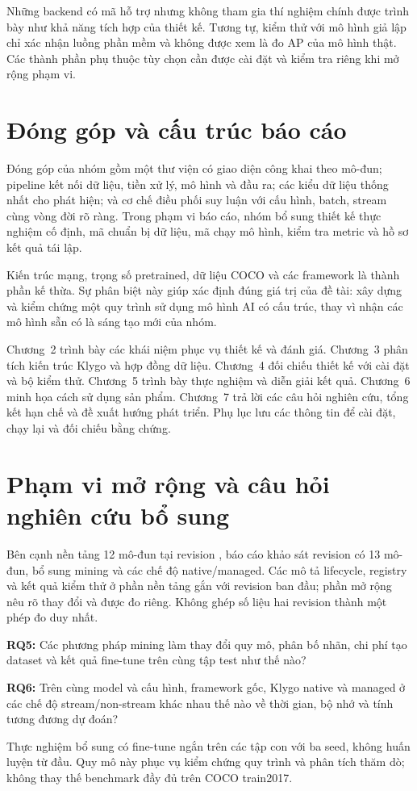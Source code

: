 Những backend có mã hỗ trợ nhưng không tham gia thí nghiệm chính được trình bày như khả năng tích hợp của thiết kế. Tương tự, kiểm thử với mô hình giả lập chỉ xác nhận luồng phần mềm và không được xem là đo AP của mô hình thật. Các thành phần phụ thuộc tùy chọn cần được cài đặt và kiểm tra riêng khi mở rộng phạm vi.

\section{Đóng góp và cấu trúc báo cáo}
Đóng góp của nhóm gồm một thư viện có giao diện công khai theo mô-đun; pipeline kết nối dữ liệu, tiền xử lý, mô hình và đầu ra; các kiểu dữ liệu thống nhất cho phát hiện; và cơ chế điều phối suy luận với cấu hình, batch, stream cùng vòng đời rõ ràng. Trong phạm vi báo cáo, nhóm bổ sung thiết kế thực nghiệm cố định, mã chuẩn bị dữ liệu, mã chạy mô hình, kiểm tra metric và hồ sơ kết quả tái lập.

Kiến trúc mạng, trọng số pretrained, dữ liệu COCO và các framework là thành phần kế thừa. Sự phân biệt này giúp xác định đúng giá trị của đề tài: xây dựng và kiểm chứng một quy trình sử dụng mô hình AI có cấu trúc, thay vì nhận các mô hình sẵn có là sáng tạo mới của nhóm.

Chương~2 trình bày các khái niệm phục vụ thiết kế và đánh giá. Chương~3 phân tích kiến trúc Klygo và hợp đồng dữ liệu. Chương~4 đối chiếu thiết kế với cài đặt và bộ kiểm thử. Chương~5 trình bày thực nghiệm và diễn giải kết quả. Chương~6 minh họa cách sử dụng sản phẩm. Chương~7 trả lời các câu hỏi nghiên cứu, tổng kết hạn chế và đề xuất hướng phát triển. Phụ lục lưu các thông tin để cài đặt, chạy lại và đối chiếu bằng chứng.

\section{Phạm vi mở rộng và câu hỏi nghiên cứu bổ sung}
Bên cạnh nền tảng 12 mô-đun tại revision , báo cáo khảo sát revision  có 13 mô-đun, bổ sung mining và các chế độ native/managed. Các mô tả lifecycle, registry và kết quả kiểm thử ở phần nền tảng gắn với revision ban đầu; phần mở rộng nêu rõ thay đổi và được đo riêng. Không ghép số liệu hai revision thành một phép đo duy nhất.

\textbf{RQ5:} Các phương pháp mining làm thay đổi quy mô, phân bố nhãn, chi phí tạo dataset và kết quả fine-tune trên cùng tập test như thế nào?

\textbf{RQ6:} Trên cùng model và cấu hình, framework gốc, Klygo native và managed ở các chế độ stream/non-stream khác nhau thế nào về thời gian, bộ nhớ và tính tương đương dự đoán?

Thực nghiệm bổ sung có fine-tune ngắn trên các tập con với ba seed, không huấn luyện từ đầu. Quy mô này phục vụ kiểm chứng quy trình và phân tích thăm dò; không thay thế benchmark đầy đủ trên COCO train2017.
